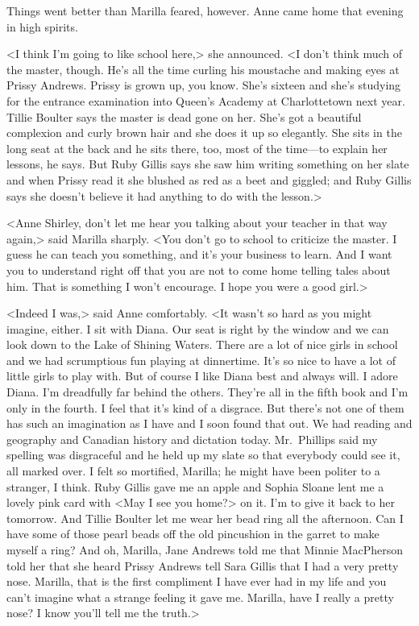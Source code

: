 Things went better than Marilla feared, however. Anne came home that evening in high spirits.

<I think I'm going to like school here,> she announced. <I don't think much of the master, though. He's all the time curling his moustache and making eyes at Prissy Andrews. Prissy is grown up, you know. She's sixteen and she's studying for the entrance examination into Queen's Academy at Charlottetown next year. Tillie Boulter says the master is dead gone on her. She's got a beautiful complexion and curly brown hair and she does it up so elegantly. She sits in the long seat at the back and he sits there, too, most of the time—to explain her lessons, he says. But Ruby Gillis says she saw him writing something on her slate and when Prissy read it she blushed as red as a beet and giggled; and Ruby Gillis says she doesn't believe it had anything to do with the lesson.>

<Anne Shirley, don't let me hear you talking about your teacher in that way again,> said Marilla sharply. <You don't go to school to criticize the master. I guess he can teach you something, and it's your business to learn. And I want you to understand right off that you are not to come home telling tales about him. That is something I won't encourage. I hope you were a good girl.>

<Indeed I was,> said Anne comfortably. <It wasn't so hard as you might imagine, either. I sit with Diana. Our seat is right by the window and we can look down to the Lake of Shining Waters. There are a lot of nice girls in school and we had scrumptious fun playing at dinnertime. It's so nice to have a lot of little girls to play with. But of course I like Diana best and always will. I adore Diana. I'm dreadfully far behind the others. They're all in the fifth book and I'm only in the fourth. I feel that it's kind of a disgrace. But there's not one of them has such an imagination as I have and I soon found that out. We had reading and geography and Canadian history and dictation today. Mr.~Phillips said my spelling was disgraceful and he held up my slate so that everybody could see it, all marked over. I felt so mortified, Marilla; he might have been politer to a stranger, I think. Ruby Gillis gave me an apple and Sophia Sloane lent me a lovely pink card with <May I see you home?> on it. I'm to give it back to her tomorrow. And Tillie Boulter let me wear her bead ring all the afternoon. Can I have some of those pearl beads off the old pincushion in the garret to make myself a ring? And oh, Marilla, Jane Andrews told me that Minnie MacPherson told her that she heard Prissy Andrews tell Sara Gillis that I had a very pretty nose. Marilla, that is the first compliment I have ever had in my life and you can't imagine what a strange feeling it gave me. Marilla, have I really a pretty nose? I know you'll tell me the truth.>


